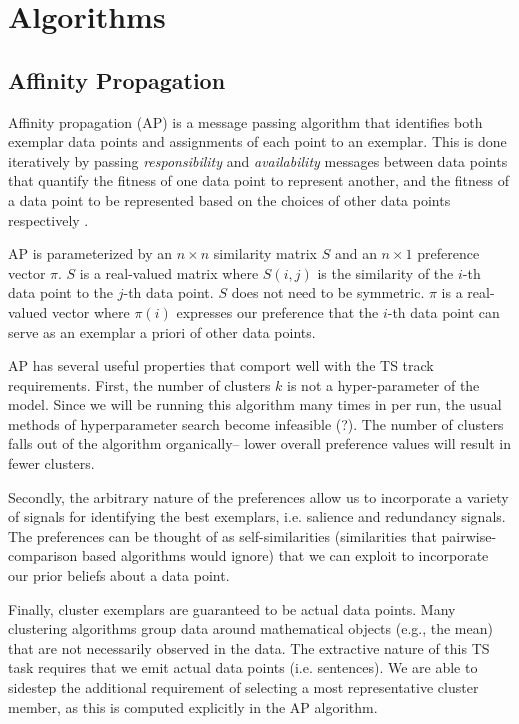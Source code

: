 \section{Algorithms}\label{sec:background}

\subsection{Affinity Propagation}

Affinity propagation (AP) is a message passing algorithm that identifies both
exemplar data points and assignments of each point to an exemplar.  This is
done iteratively by passing \emph{responsibility} and \emph{availability}
messages between data points that quantify the fitness of one data point to
represent another, and the fitness of a data point to be represented based on
the choices of other data points respectively \cite{dueck2007non}.

AP is parameterized by an $n\times n$ similarity matrix $S$ and an $n\times 1$
preference vector $\pi$.  $S$ is a real-valued matrix where $S(i,j)$ is the
similarity of the $i$-th data point to the $j$-th data point.  $S$ does not
need to be symmetric.  $\pi$ is a real-valued vector where $\pi(i)$ expresses
our preference that the $i$-th data point can serve as an exemplar a priori of
other data points. 




AP has several useful properties that comport well with the TS track 
requirements. First, the number of clusters $k$ is not a hyper-parameter
of the model. Since we will be running this algorithm many times in per run,
the usual methods of hyperparameter search become infeasible 
(?). The number of clusters falls out of the algorithm
organically-- lower overall preference values will result in fewer clusters. 

Secondly, the arbitrary nature of the preferences
allow us to incorporate a variety of signals for
identifying the best exemplars, i.e. salience and redundancy signals. 
The preferences can be thought of as self-similarities (similarities that
pairwise-comparison based algorithms would ignore) that we can exploit to 
incorporate our prior beliefs about a data point.

Finally, cluster exemplars are guaranteed to be actual data points. Many 
clustering algorithms group data around mathematical objects (e.g., the
mean) that are not necessarily observed in the data. The extractive nature of
this TS task requires that we emit actual data points (i.e. sentences).
We are able to sidestep 
the additional requirement of selecting a most
representative cluster member, as this is computed explicitly in the AP 
algorithm. 





